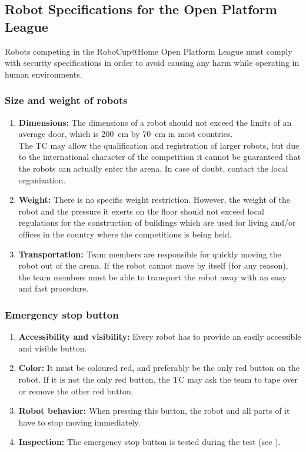\subsection{Robot Specifications for the Open Platform League }
Robots competing in the RoboCup@Home Open Platform League must comply with security specifications in order to avoid causing any harm while operating in human environments.

\subsubsection{Size and weight of robots}
\label{rule:robots_size}

\begin{enumerate}
	\item \textbf{Dimensions:} The dimensions of a robot should not exceed the limits of an average door, which is \SI{200}{\centi\meter} by \SI{70}{\centi\meter} in most countries.\\ 
	The TC may allow the qualification and registration of larger robots, but due to the international character of the competition it cannot be guaranteed that the robots can actually enter the arena. In case of doubt, contact the local organization. 
	\item \textbf{Weight:} There is no specific weight restriction. However, the weight of the robot and the pressure it exerts on the floor should not exceed local regulations for the construction of buildings which are used for living and/or offices in the country where the competitions is being held.
	\item \textbf{Transportation:} Team members are responsible for quickly moving the robot out of the arena.	If the robot cannot move by itself (for any reason), the team members must be able to transport the robot away with an easy and fast procedure.
\end{enumerate}

\subsubsection{Emergency stop button}
\label{rule:robots_emergency_button}

\begin{enumerate}
	\item \textbf{Accessibility and visibility:} Every robot has to provide an easily accessible and visible  button. 
	\item \textbf{Color:} It must be coloured red, and preferably be the only red button on the robot. If it is not the only red button, the TC may ask the team to tape over or remove the other red button. 
	\item \textbf{Robot behavior:} When pressing this button, the robot and all parts of it have to stop moving immediately.
	\item \textbf{Inspection:} The emergency stop button is tested during the  test (see ).
\end{enumerate}





